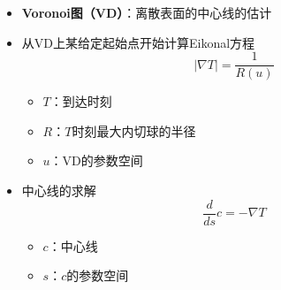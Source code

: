 \begin{frame}
\begin{itemize}
\item \textbf{Voronoi图（VD）}：离散表面的中心线的估计

\item 从VD上某给定起始点开始计算Eikonal方程
\begin{equation*}
\left| \nabla T \right| = \frac{1}{R(u)}
\end{equation*}
\begin{itemize}
\item $T$：到达时刻
\item $R$：$T$时刻最大内切球的半径
\item $u$：VD的参数空间
\end{itemize}
\item 中心线的求解
\begin{equation*}
\frac{d}{ds} c = - \nabla T
\end{equation*}
\begin{itemize}
\item $c$：中心线
\item $s$：$c$的参数空间
\end{itemize}
\end{itemize}
\end{frame}

% 

